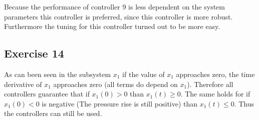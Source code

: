 \documentclass[a4paper,12pt]{article}
\begin{document}
Because the performance of controller 9 is less dependent on the system parameters this controller is preferred, since this controller is more robust. Furthermore the tuning for this controller turned out to be more easy.


\subsection{Exercise 14}
As can been seen in the subsystem $x_1$ if the value of $x_1$ approaches zero, the time derivative of $x_1$ approaches zero (all terms do depend on $x_1$). Therefore all controllers guarantee that if $x_1(0) > 0$ than $x_1(t) \geq 0$. The same holds for if $x_1(0) < 0$ is negative (The pressure rise is still positive) than $x_1(t) \leq 0$.  Thus the controllers can still be used.
\end{document}
